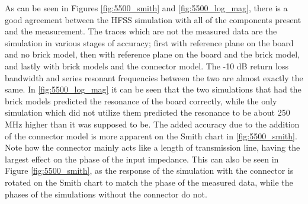 \documentclass[12pt]{usfcoe}
\begin{document}
    As can be seen in Figures \ref{fig:5500_smith} and \ref{fig:5500_log_mag}, there is a good agreement between the HFSS simulation with all of the components present and the measurement. 
    The traces which are not the measured data are the simulation in various stages of accuracy; first with reference plane on the board and no brick model, then with reference plane on the board and the brick model, and lastly with brick models and the connector model. 
    The -10 dB return loss bandwidth and series resonant frequencies between the two are almost exactly the same. 
    In \ref{fig:5500_log_mag} it can be seen that the two simulations that had the brick models predicted the resonance of the board correctly, while the only simulation which did not utilize them predicted the resonance to be about 250 MHz higher than it was supposed to be.
    The added accuracy due to the addition of the connector model is more apparent on the Smith chart in \ref{fig:5500_smith}.
    Note how the connector mainly acts like a length of transmission line, having the largest effect on the phase of the input impedance.
    This can also be seen in Figure \ref{fig:5500_smith}, as the response of the simulation with the connector is rotated on the Smith chart to match the phase of the measured data, while the phases of the simulations without the connector do not. 
\end{document}
